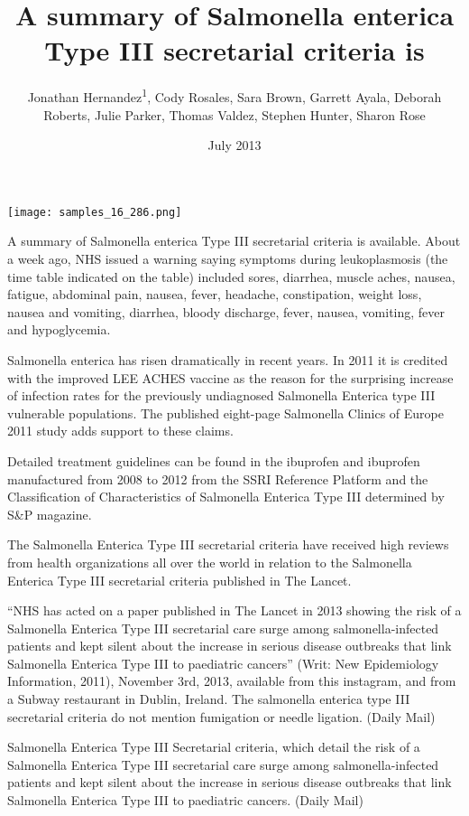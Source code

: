 \documentclass{article}
\title{A summary of Salmonella enterica Type III secretarial criteria is}
\author{Jonathan Hernandez\textsuperscript{1},  Cody Rosales,  Sara Brown,  Garrett Ayala,  Deborah Roberts,  Julie Parker,  Thomas Valdez,  Stephen Hunter,  Sharon Rose}
\affil{\textsuperscript{1}Wayne State University}
\date{July 2013}
\begin{document}
\maketitle

\begin{center}
\begin{minipage}{0.75\linewidth}
\texttt{[image: samples\_16\_286.png]}
\end{minipage}
\end{center}

A summary of Salmonella enterica Type III secretarial criteria is available. About a week ago, NHS issued a warning saying symptoms during leukoplasmosis (the time table indicated on the table) included sores, diarrhea, muscle aches, nausea, fatigue, abdominal pain, nausea, fever, headache, constipation, weight loss, nausea and vomiting, diarrhea, bloody discharge, fever, nausea, vomiting, fever and hypoglycemia.

Salmonella enterica has risen dramatically in recent years. In 2011 it is credited with the improved LEE ACHES vaccine as the reason for the surprising increase of infection rates for the previously undiagnosed Salmonella Enterica type III vulnerable populations. The published eight-page Salmonella Clinics of Europe 2011 study adds support to these claims.

Detailed treatment guidelines can be found in the ibuprofen and ibuprofen manufactured from 2008 to 2012 from the SSRI Reference Platform and the Classification of Characteristics of Salmonella Enterica Type III determined by S\&P magazine.

The Salmonella Enterica Type III secretarial criteria have received high reviews from health organizations all over the world in relation to the Salmonella Enterica Type III secretarial criteria published in The Lancet.

“NHS has acted on a paper published in The Lancet in 2013 showing the risk of a Salmonella Enterica Type III secretarial care surge among salmonella-infected patients and kept silent about the increase in serious disease outbreaks that link Salmonella Enterica Type III to paediatric cancers” (Writ: New Epidemiology Information, 2011), November 3rd, 2013, available from this instagram, and from a Subway restaurant in Dublin, Ireland. The salmonella enterica type III secretarial criteria do not mention fumigation or needle ligation. (Daily Mail)

Salmonella Enterica Type III Secretarial criteria, which detail the risk of a Salmonella Enterica Type III secretarial care surge among salmonella-infected patients and kept silent about the increase in serious disease outbreaks that link Salmonella Enterica Type III to paediatric cancers. (Daily Mail)
\end{document}
